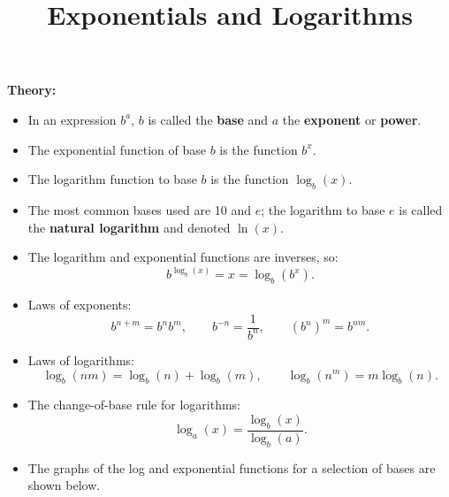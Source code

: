 \documentclass{article}
\begin{document}
\title{Exponentials and Logarithms}
\date{}

\maketitle
\thispagestyle{empty}

\Large



\textbf{Theory:}\bigskip

\begin{itemize}
	\item In an expression $b^a$, $b$ is called the \textbf{base} and $a$ the \textbf{exponent} or \textbf{power}.
	\item The exponential function of base $b$ is the function $b^x$.
	\item The logarithm function to base $b$ is the function $\log_b(x)$.
	\item The most common bases used are 10 and $e$; the logarithm to base $e$ is called the \textbf{natural logarithm} and denoted $\ln(x)$.
	\item The logarithm and exponential functions are inverses, so:
		\[b^{\log_b(x)}=x=\log_b(b^x).\]
	\item Laws of exponents:
		\[b^{n+m}=b^nb^m,\qquad b^{-n}=\frac{1}{b^n},\qquad (b^n)^m=b^{nm}.\]
	\item Laws of logarithms:
		\[\log_b(nm)=\log_b(n)+\log_b(m),\qquad \log_b(n^m)=m\log_b(n).\]
	\item The change-of-base rule for logarithms:
		\[\log_a(x)=\frac{\log_b(x)}{\log_b(a)}.\]
	\item The graphs of the log and exponential functions for a selection of bases are shown below.
		\begin{center}


\end{center}
\end{itemize}
\end{document}
